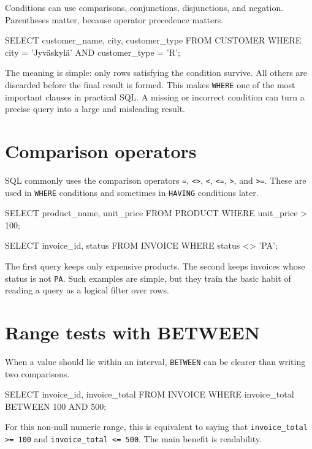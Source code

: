 \documentclass[11pt,a4paper,openany]{book}
\begin{document}
Conditions can use comparisons, conjunctions, disjunctions, and negation. Parentheses matter, because operator precedence matters.

\begin{codesql}
SELECT customer_name, city, customer_type
FROM CUSTOMER
WHERE city = 'Jyväskylä'
  AND customer_type = 'R';
\end{codesql}

The meaning is simple: only rows satisfying the condition survive. All others are discarded before the final result is formed. This makes \texttt{WHERE} one of the most important clauses in practical SQL. A missing or incorrect condition can turn a precise query into a large and misleading result.

\section{Comparison operators}
SQL commonly uses the comparison operators \texttt{=}, \texttt{<>}, \texttt{<}, \texttt{<=}, \texttt{>}, and \texttt{>=}. These are used in \texttt{WHERE} conditions and sometimes in \texttt{HAVING} conditions later.

\begin{codesql}
SELECT product_name, unit_price
FROM PRODUCT
WHERE unit_price > 100;
\end{codesql}

\begin{codesql}
SELECT invoice_id, status
FROM INVOICE
WHERE status <> 'PA';
\end{codesql}

The first query keeps only expensive products. The second keeps invoices whose status is not \texttt{PA}. Such examples are simple, but they train the basic habit of reading a query as a logical filter over rows.

\section{Range tests with BETWEEN}
When a value should lie within an interval, \texttt{BETWEEN} can be clearer than writing two comparisons.

\begin{codesql}
SELECT invoice_id, invoice_total
FROM INVOICE
WHERE invoice_total BETWEEN 100 AND 500;
\end{codesql}

For this non-null numeric range, this is equivalent to saying that \texttt{invoice\_total >= 100} and \texttt{invoice\_total <= 500}. The main benefit is readability.
\end{document}
